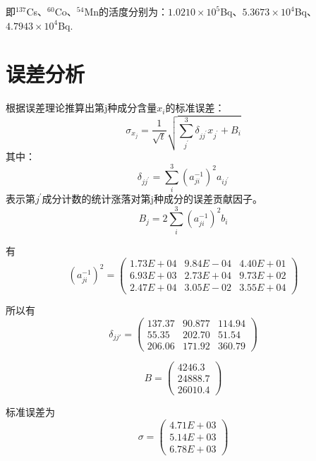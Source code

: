 \documentclass[a4paper,10.0pt,twoside]{npr}
\begin{document}
\begin{multicols}{2}
即$^{137}$Cs、$^{60}$Co、$^{54}$Mn的活度分别为：$1.0210\times 10^{5}$Bq、$5.3673\times 10^{4}$Bq、$4.7943\times 10^{4}$Bq.

\section{误差分析}
根据误差理论推算出第j种成分含量$x_{i}$的标准误差：
\begin{equation}
\sigma _{x_{j} }=\frac{1}{\sqrt{t}}\sqrt{\sum_{j^{'}}^{3}\delta _{jj^{'}}x_{j^{'}}+B_{i}}
\end{equation}
其中：
\begin{equation}
\delta _{jj^{'}}=\sum_{i}^{3}(a_{ji}^{-1})^{2}a_{ij^{'}}
\end{equation}
表示第$j^{'}$成分计数的统计涨落对第j种成分的误差贡献因子。
\begin{equation}
B _{j}=2\sum_{i}^{3}(a_{ji}^{-1})^{2}b_{i}
\end{equation}

有
\begin{equation}
	(a_{ji}^{-1})^2 =\begin{pmatrix}
1.73E+04&	9.84E-04&	4.40E+01\\
6.93E+03&	2.73E+04&	9.73E+02\\
2.47E+04&	3.05E-02&	3.55E+04
\end{pmatrix}
\end{equation}

所以有
\begin{equation}
	\delta_{jj'} =\begin{pmatrix}
137.37&	90.877&	114.94\\
55.35&	202.70&	51.54\\
206.06&	171.92&	360.79
\end{pmatrix}
\end{equation}

\begin{equation}
	B=\begin{pmatrix}
	4246.3\\
	24888.7\\
	26010.4
	\end{pmatrix}
\end{equation}

标准误差为
\begin{equation}
	\sigma=\begin{pmatrix}
	4.71E+03\\
	5.14E+03\\
	6.78E+03
	\end{pmatrix}
\end{equation}


\end{multicols}
\end{document}
